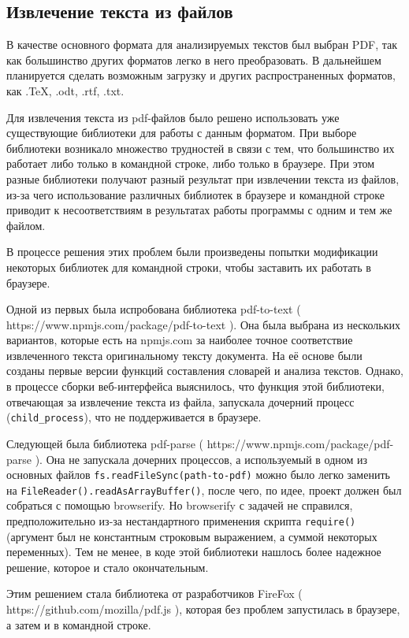 \documentclass[a4paper,openbib]{report}
\begin{document}
\subsection*{Извлечение текста из файлов}

В качестве основного формата для анализируемых текстов был выбран PDF, так как большинство других форматов легко в него преобразовать. В дальнейшем планируется 
сделать возможным загрузку и других распространенных форматов, как .TeX, .odt, .rtf, .txt.

Для извлечения текста из pdf-файлов было решено использовать уже существующие библиотеки для работы с данным форматом. При выборе библиотеки возникало множество 
трудностей в связи с тем, что большинство их работает либо только в командной строке, либо только в браузере. При этом разные библиотеки получают разный результат 
при извлечении текста из файлов, из-за чего использование различных библиотек в браузере и командной строке приводит к несоответствиям в результатах работы программы 
с одним и тем же файлом.

В процессе решения этих проблем были произведены попытки модификации некоторых библиотек для командной строки, чтобы заставить их 
работать в браузере.

Одной из первых была испробована библиотека pdf-to-text ( https://www.npmjs.com/package/pdf-to-text ). Она была выбрана из нескольких вариантов, которые есть на npmjs.com 
за наиболее точное соответствие извлеченного текста оригинальному тексту документа. На её основе были созданы первые версии функций составления словарей и анализа текстов. 
Однако, в процессе сборки веб-интерфейса выяснилось, что функция этой библиотеки, отвечающая за извлечение текста из файла, запускала дочерний процесс (\verb|child_process|), 
что не поддерживается в браузере.

Следующей была библиотека pdf-parse ( https://www.npmjs.com/package/pdf-parse ). Она не запускала дочерних процессов, а используемый в одном из основных файлов 
\verb|fs.readFileSync(path-to-pdf)| можно было легко заменить на \verb|FileReader().readAsArrayBuffer()|, после чего, по идее, проект должен был собраться 
с помощью browserify. Но browserify с задачей не справился, предположительно из-за нестандартного применения скрипта \verb|require()| (аргумент был не константным 
строковым выражением, а суммой некоторых переменных). Тем не менее, в коде этой библиотеки нашлось более надежное решение, которое и стало окончательным.

Этим решением стала библиотека от разработчиков FireFox ( https://github.com/mozilla/pdf.js ), которая без проблем запустилась в браузере, а затем и в командной 
строке. 
\end{document}
